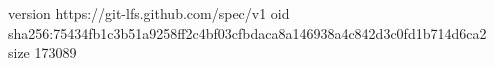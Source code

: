 version https://git-lfs.github.com/spec/v1
oid sha256:75434fb1c3b51a9258ff2c4bf03cfbdaca8a146938a4c842d3c0fd1b714d6ca2
size 173089
